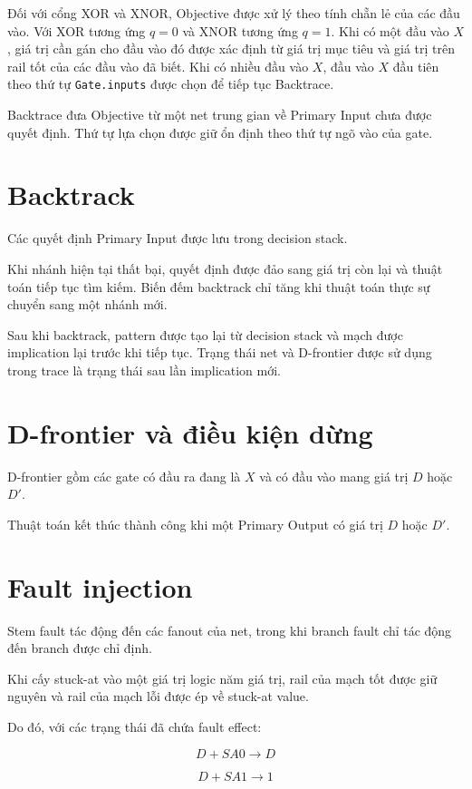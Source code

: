 Đối với cổng XOR và XNOR, Objective được xử lý theo tính chẵn lẻ của các
đầu vào. Với XOR tương ứng $q=0$ và XNOR tương ứng $q=1$. Khi có một đầu vào
$X$, giá trị cần gán cho đầu vào đó được xác định từ giá trị mục tiêu và
giá trị trên rail tốt của các đầu vào đã biết. Khi có nhiều đầu vào $X$,
đầu vào $X$ đầu tiên theo thứ tự \texttt{Gate.inputs} được chọn để tiếp tục
Backtrace.

Backtrace đưa Objective từ một net trung gian về Primary Input chưa được
quyết định. Thứ tự lựa chọn được giữ ổn định theo thứ tự ngõ vào của gate.

\section{Backtrack}

Các quyết định Primary Input được lưu trong decision stack.

Khi nhánh hiện tại thất bại, quyết định được đảo sang giá trị còn lại và
thuật toán tiếp tục tìm kiếm. Biến đếm backtrack chỉ tăng khi thuật toán
thực sự chuyển sang một nhánh mới.

Sau khi backtrack, pattern được tạo lại từ decision stack và mạch được
implication lại trước khi tiếp tục. Trạng thái net và D-frontier được sử
dụng trong trace là trạng thái sau lần implication mới.

\section{D-frontier và điều kiện dừng}

D-frontier gồm các gate có đầu ra đang là $X$ và có đầu vào mang giá trị $D$
hoặc $D'$.

Thuật toán kết thúc thành công khi một Primary Output có giá trị $D$ hoặc
$D'$.

\section{Fault injection}

Stem fault tác động đến các fanout của net, trong khi branch fault chỉ tác
động đến branch được chỉ định.

Khi cấy stuck-at vào một giá trị logic năm giá trị, rail của mạch tốt được
giữ nguyên và rail của mạch lỗi được ép về stuck-at value.

Do đó, với các trạng thái đã chứa fault effect:

\[
D + SA0 \rightarrow D
\]

\[
D + SA1 \rightarrow 1
\]

